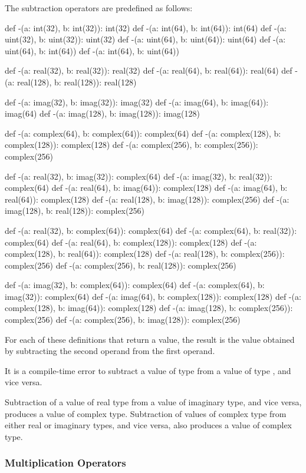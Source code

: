 The subtraction operators are predefined as follows:
\begin{chapel}
def -(a: int(32), b: int(32)): int(32)
def -(a: int(64), b: int(64)): int(64)
def -(a: uint(32), b: uint(32)): uint(32)
def -(a: uint(64), b: uint(64)): uint(64)
def -(a: uint(64), b: int(64))
def -(a: int(64), b: uint(64))

def -(a: real(32), b: real(32)): real(32)
def -(a: real(64), b: real(64)): real(64)
def -(a: real(128), b: real(128)): real(128)

def -(a: imag(32), b: imag(32)): imag(32)
def -(a: imag(64), b: imag(64)): imag(64)
def -(a: imag(128), b: imag(128)): imag(128)

def -(a: complex(64), b: complex(64)): complex(64)
def -(a: complex(128), b: complex(128)): complex(128)
def -(a: complex(256), b: complex(256)): complex(256)

def -(a: real(32), b: imag(32)): complex(64)
def -(a: imag(32), b: real(32)): complex(64)
def -(a: real(64), b: imag(64)): complex(128)
def -(a: imag(64), b: real(64)): complex(128)
def -(a: real(128), b: imag(128)): complex(256)
def -(a: imag(128), b: real(128)): complex(256)

def -(a: real(32), b: complex(64)): complex(64)
def -(a: complex(64), b: real(32)): complex(64)
def -(a: real(64), b: complex(128)): complex(128)
def -(a: complex(128), b: real(64)): complex(128)
def -(a: real(128), b: complex(256)): complex(256)
def -(a: complex(256), b: real(128)): complex(256)

def -(a: imag(32), b: complex(64)): complex(64)
def -(a: complex(64), b: imag(32)): complex(64)
def -(a: imag(64), b: complex(128)): complex(128)
def -(a: complex(128), b: imag(64)): complex(128)
def -(a: imag(128), b: complex(256)): complex(256)
def -(a: complex(256), b: imag(128)): complex(256)
\end{chapel}
For each of these definitions that return a value, the result is the
value obtained by subtracting the second operand from the first
operand.

It is a compile-time error to subtract a value of type 
from a value of type , and vice versa.

Subtraction of a value of real type from a value of imaginary type,
and vice versa, produces a value of complex type.  Subtraction of
values of complex type from either real or imaginary types, and vice
versa, also produces a value of complex type.

\subsubsection{Multiplication Operators}
\label{Multiplication_Operators}

